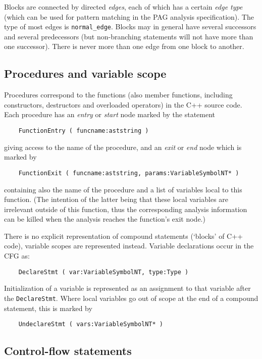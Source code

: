Blocks are connected by directed \emph{edges}, each of which has a
certain \emph{edge type} (which can be used for pattern matching in
the PAG analysis specification). The type of most edges is
\verb|normal_edge|. Blocks may in general have several successors
and several predecessors (but non-branching statements will
not have more than one successor). There is never more than one edge
from one block to another.

\subsection{Procedures and variable scope}

Procedures correspond to the functions (also member functions,
including constructors, destructors and overloaded operators) in the
C++ source code. Each procedure has an \emph{entry} or \emph{start}
node marked by the statement
\begin{verbatim}
    FunctionEntry ( funcname:aststring )
\end{verbatim}
giving access to the name of the procedure, and an \emph{exit} or
\emph{end} node which is marked by
\begin{verbatim}
    FunctionExit ( funcname:aststring, params:VariableSymbolNT* )
\end{verbatim}
containing also the name of the procedure and a list of variables
local to this function. (The intention of the latter being that
these local variables are irrelevant outside of this function, thus
the corresponding analysis information can be killed when the
analysis reaches the function's exit node.)

There is no explicit representation of compound statements (`blocks'
of C++ code), variable scopes are represented instead. Variable
declarations occur in the CFG as:
\begin{verbatim}
    DeclareStmt ( var:VariableSymbolNT, type:Type )
\end{verbatim}
Initialization of a variable is represented as an assignment to that
variable after the \verb|DeclareStmt|. Where local variables go out
of scope at the end of a compound statement, this is marked by
\begin{verbatim}
    UndeclareStmt ( vars:VariableSymbolNT* )
\end{verbatim}

\subsection{Control-flow statements}

